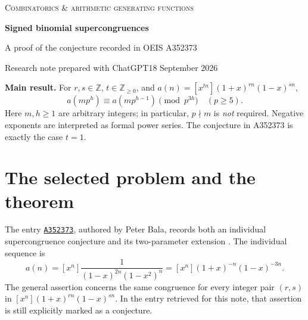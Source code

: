 \documentclass[11pt,a4paper]{article}
\numberwithin{equation}{section}
\theoremstyle{research}
\theoremstyle{definition}
\newcommand{\Z}{\mathbb Z}
\newcommand{\oeis}[1]{\href{https://oeis.org/#1}{\texttt{#1}}}
\begin{document}
\thispagestyle{empty}
{\large\color{Accent}\textsc{Combinatorics \& arithmetic generating functions}\par}
\vspace{6mm}
{\huge\bfseries\color{Ink}Signed binomial supercongruences\par}
\vspace{2mm}
{\Large A proof of the conjecture recorded in OEIS A352373\par}
\vspace{5mm}
{\normalsize Research note prepared with ChatGPT\hfill 18 September 2026\par}
\vspace{4mm}
\begin{abstract}
The OEIS entry A352373 records a conjecture that every sequence
$a_{r,s}(n)=[x^n](1+x)^{rn}(1-x)^{sn}$, with arbitrary integer $r,s$,
satisfies the two-term congruences modulo $p^{3h}$ for primes $p\ge5$.
We give a proof, allowing the coefficient index to be any nonnegative
integer multiple $tn$. The argument separates indices divisible by $p$
from the remaining indices. Jacobsthal's binomial congruence treats the
first part; a multiscale alternating reciprocal-square cancellation treats
the second. The same proof gives modulus $3^{3h-1}$ at $p=3$.
We derive four OEIS specializations, a denominator restriction for a
M\"obius transform, and formal Lambert-series and trilogarithm expansions.
Exact computations check 13,690 family congruences and 15,154 proof-component
instances. The proof uses a precisely cited classical congruence; it has
not been independently refereed or formally verified, and publication
priority is not claimed.
\end{abstract}

\begin{tcolorbox}[colback=Pale,colframe=Accent,boxrule=0.6pt,arc=0pt,
 left=3mm,right=3mm,top=2mm,bottom=2mm]
\textbf{Main result.} For $r,s\in\Z$, $t\in\Z_{\ge0}$, and
$a(n)=[x^{tn}](1+x)^{rn}(1-x)^{sn}$,
\[
 \boxed{\quad a(mp^h)\equiv a(mp^{h-1})\pmod{p^{3h}}
 \quad(p\ge5).\quad}
\]
Here $m,h\ge1$ are arbitrary integers; in particular, $p\nmid m$ is
\emph{not} required. Negative exponents are interpreted as formal power
series. The conjecture in A352373 is exactly the case $t=1$.
\end{tcolorbox}

\section{The selected problem and the theorem}
\label{sec:problem}
The entry \oeis{A352373}, authored by Peter Bala, records both an individual
supercongruence conjecture and its two-parameter extension \cite{A352373}.
The individual sequence is
\begin{equation}\label{eq:selected}
 a(n)=[x^n]\frac{1}{(1-x)^{2n}(1-x^2)^n}
     =[x^n](1+x)^{-n}(1-x)^{-3n}.
\end{equation}
The general assertion concerns the same congruence for every integer pair
$(r,s)$ in $[x^n](1+x)^{rn}(1-x)^{sn}$. In the entry retrieved for this
note, that assertion is still explicitly marked as a conjecture.
\end{document}
